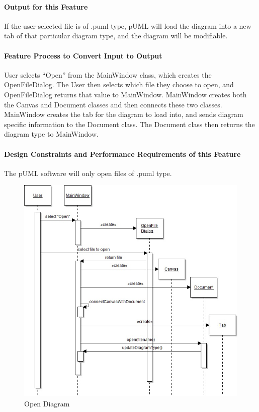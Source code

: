 \documentclass[twoside,letterpaper]{article}
\begin{document}
{\paragraph{Output for this Feature}
{
If the user-selected file is of .puml type, pUML will load the diagram into a new tab of that particular diagram type, and the diagram will be modifiable.
}

\paragraph{Feature Process to Convert Input to Output}
{
User selects ``Open'' from the MainWindow class, which creates the OpenFileDialog.  The User then selects which file they choose to open, and OpenFileDialog returns that value to MainWindow.  MainWindow creates both the Canvas and Document classes and then connects these two classes. MainWindow creates the tab for the diagram to load into, and sends diagram specific information to the Document class. The Document class then returns the diagram type to MainWindow.
}

\paragraph{Design Constraints and Performance Requirements of this Feature}
{
The pUML software will only open files of .puml type. 
}
\bigskip

\begin{figure}[h]
\centering
\includegraphics[width=6.0in]{IntOpen.jpg}
\caption{Open Diagram}
\end{figure}
\clearpage



}
\end{document}
